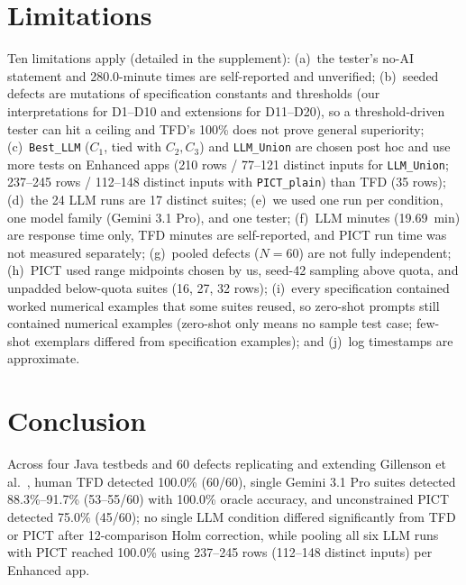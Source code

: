 \documentclass[acmsmall]{acmart}
\begin{document}
\section{Limitations}
\label{sec:limitations}

Ten limitations apply (detailed in the supplement): (a)~the tester's no-AI statement and 280.0-minute times are self-reported and unverified; (b)~seeded defects are mutations of specification constants and thresholds (our interpretations for D1--D10 and extensions for D11--D20), so a threshold-driven tester can hit a ceiling and TFD's 100\% does not prove general superiority; (c)~\texttt{Best\_LLM} ($C_1$, tied with $C_2, C_3$) and \texttt{LLM\_Union} are chosen post hoc and use more tests on Enhanced apps (210 rows / 77--121 distinct inputs for \texttt{LLM\_Union}; 237--245 rows / 112--148 distinct inputs with \texttt{PICT\_plain}) than TFD (35 rows); (d)~the 24 LLM runs are 17 distinct suites; (e)~we used one run per condition, one model family (Gemini 3.1 Pro), and one tester; (f)~LLM minutes (19.69~min) are response time only, TFD minutes are self-reported, and PICT run time was not measured separately; (g)~pooled defects ($N=60$) are not fully independent; (h)~PICT used range midpoints chosen by us, seed-42 sampling above quota, and unpadded below-quota suites (16, 27, 32 rows); (i)~every specification contained worked numerical examples that some suites reused, so zero-shot prompts still contained numerical examples (zero-shot only means no sample test case; few-shot exemplars differed from specification examples); and (j)~log timestamps are approximate.

\section{Conclusion}
\label{sec:conclusion}

Across four Java testbeds and 60 defects replicating and extending Gillenson et al.~\cite{Gillenson2026}, human TFD detected 100.0\% (60/60), single Gemini 3.1 Pro suites detected 88.3\%--91.7\% (53--55/60) with 100.0\% oracle accuracy, and unconstrained PICT detected 75.0\% (45/60); no single LLM condition differed significantly from TFD or PICT after 12-comparison Holm correction, while pooling all six LLM runs with PICT reached 100.0\% using 237--245 rows (112--148 distinct inputs) per Enhanced app.
\end{document}
